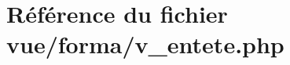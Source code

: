 \hypertarget{v__entete_8php}{}\section{Référence du fichier vue/forma/v\+\_\+entete.php}
\label{v__entete_8php}
